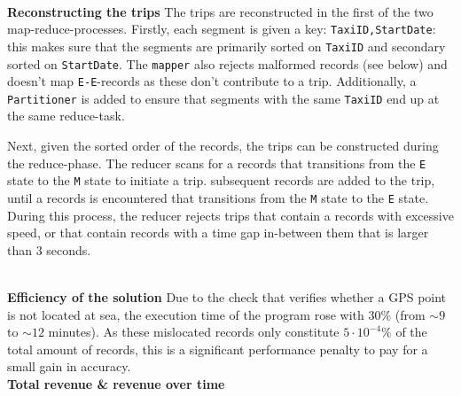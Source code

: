 \documentclass[12pt]{article}
\newcommand{\todo}{{\color{red}{\textbf{TODO }}}}
\begin{document}
\noindent\\\textbf{Reconstructing the trips}
The trips are reconstructed in the first of the two map-reduce-processes. Firstly, each segment is given a key: \texttt{TaxiID,StartDate}: this makes sure that the segments are primarily sorted on \texttt{TaxiID} and secondary sorted on \texttt{StartDate}. The \texttt{mapper} also rejects malformed records (see below) and doesn't map \texttt{E-E}-records as these don't contribute to a trip. Additionally, a \texttt{Partitioner} is added to ensure that segments with the same \texttt{TaxiID} end up at the same reduce-task. 

Next, given the sorted order of the records, the trips can be constructed during the reduce-phase. The reducer scans for a records that transitions from the \texttt{E} state to the \texttt{M} state to initiate a trip. subsequent records are added to the trip, until a records is encountered that transitions from the \texttt{M} state to the \texttt{E} state. During this process, the reducer rejects trips that contain a records with excessive speed, or that contain records with a time gap in-between them that is larger than 3 seconds.

\noindent\\\textbf{Efficiency of the solution}
\todo Due to the check that verifies whether a GPS point is not located at sea, the execution time of the program rose with 30\% (from $\sim9$ to $\sim12$ minutes). As these mislocated records only constitute $5\cdot 10^{-4}\%$ of the total amount of records, this is a significant performance penalty to pay for a small gain in accuracy.
\noindent\\\textbf{Total revenue \& revenue over time}
\end{document}
